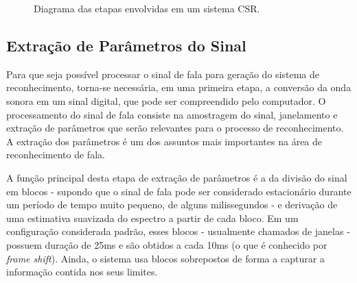 \documentclass[12pt,a4paper,oneside]{report}
\begin{document}
\begin{figure}[h!]
\centering
{}\caption{Diagrama das etapas envolvidas em um sistema CSR.}
\label{fig:CSR}
\end{figure}

\subsection{Extração de Parâmetros do Sinal}


Para que seja possível processar o sinal de fala para geração do sistema de reconhecimento, torna-se necessária, em uma primeira etapa, a conversão da onda sonora em um sinal digital, que pode ser compreendido pelo computador. O processamento do sinal de fala consiste na amostragem do sinal, janelamento e extração de parâmetros que serão relevantes para o processo de reconhecimento. A extração dos parâmetros é um dos assuntos mais importantes na área de reconhecimento de fala.

A função principal desta etapa de extração de parâmetros é a da divisão do sinal em blocos - supondo que o sinal de fala pode ser considerado estacionário durante um período de tempo muito pequeno, de alguns milissegundos - e derivação de uma estimativa suavizada do espectro a partir de cada bloco. Em um configuração considerada padrão,
esses blocos - usualmente chamados de janelas - possuem duração de 25ms e são obtidos a cada 10ms (o que é conhecido por \emph{frame shift}). Ainda, o sistema usa blocos sobrepostos de forma a capturar a informação contida nos seus limites.
\end{document}
